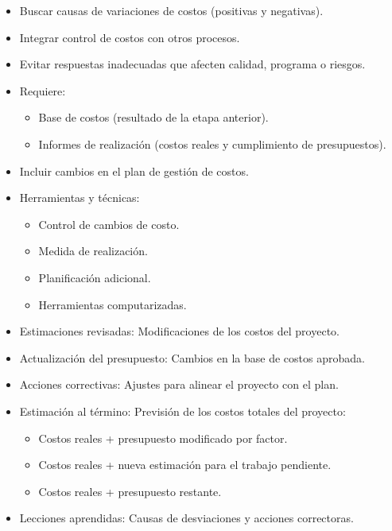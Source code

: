 \documentclass{article} %
\begin{document}
\begin{itemize}
    \item Buscar causas de variaciones de costos (positivas y negativas).
    \item Integrar control de costos con otros procesos.
    \item Evitar respuestas inadecuadas que afecten calidad, programa o riesgos.
    \item Requiere:
    \begin{itemize}
        \item Base de costos (resultado de la etapa anterior).
        \item Informes de realización (costos reales y cumplimiento de presupuestos).
    \end{itemize}
    \item Incluir cambios en el plan de gestión de costos.
    \item Herramientas y técnicas:
    \begin{itemize}
        \item Control de cambios de costo.
        \item Medida de realización.
        \item Planificación adicional.
        \item Herramientas computarizadas.
    \end{itemize}
\end{itemize}
\begin{itemize}
    \item Estimaciones revisadas: Modificaciones de los costos del proyecto.
    \item Actualización del presupuesto: Cambios en la base de costos aprobada.
    \item Acciones correctivas: Ajustes para alinear el proyecto con el plan.
    \item Estimación al término: Previsión de los costos totales del proyecto:
    \begin{itemize}
        \item Costos reales + presupuesto modificado por factor.
        \item Costos reales + nueva estimación para el trabajo pendiente.
        \item Costos reales + presupuesto restante.
    \end{itemize}
    \item Lecciones aprendidas: Causas de desviaciones y acciones correctoras.
\end{itemize}
\end{document}
